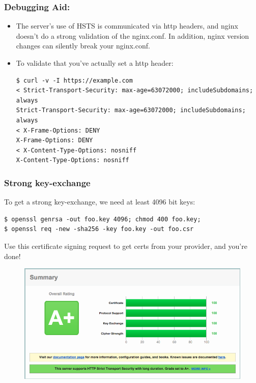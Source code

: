 \documentclass[9pt]{beamer}
\begin{document}
\begin{frame}[fragile]
\frametitle{Debugging Aid:}
\begin{itemize}
\item The server's use of HSTS is communicated via http headers, and nginx doesn't do a strong validation of the nginx.conf. In addition, nginx version changes can silently break your nginx.conf.
\pause
\item To validate that you've actually set a http header:
\begin{verbatim}
$ curl -v -I https://example.com
< Strict-Transport-Security: max-age=63072000; includeSubdomains; always
Strict-Transport-Security: max-age=63072000; includeSubdomains; always
< X-Frame-Options: DENY
X-Frame-Options: DENY
< X-Content-Type-Options: nosniff
X-Content-Type-Options: nosniff
\end{verbatim}
\end{itemize}
\end{frame}



\begin{frame}[fragile]
\frametitle{Strong key-exchange}
To get a strong key-exchange, we need at least 4096 bit keys:
\pause
\begin{verbatim}
$ openssl genrsa -out foo.key 4096; chmod 400 foo.key;
$ openssl req -new -sha256 -key foo.key -out foo.csr
\end{verbatim}
\pause
Use this certificate signing request to get certs from your provider, and you're done!
\begin{figure}
\includegraphics[scale=0.25]{figures/App.png}
\end{figure}
\end{frame}
\end{document}
